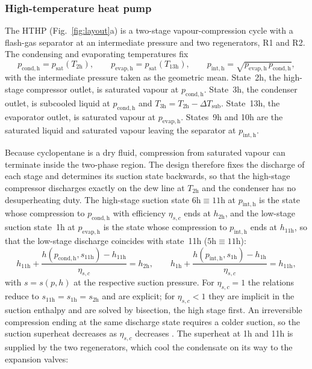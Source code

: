 \subsubsection{High-temperature heat pump}
\label{sec:hthp}

The HTHP (Fig.~\ref{fig:layout}a) is a two-stage vapour-compression cycle with
a flash-gas separator at an intermediate pressure and two regenerators, R1 and
R2. The condensing and evaporating temperatures fix
\begin{equation}
  p_\mathrm{cond,h}=p_\mathrm{sat}(T_\mathrm{2h}),\qquad
  p_\mathrm{evap,h}=p_\mathrm{sat}(T_\mathrm{13h}),\qquad
  p_\mathrm{int,h}=\sqrt{p_\mathrm{evap,h}\,p_\mathrm{cond,h}},
  \label{eq:hp-p}
\end{equation}
with the intermediate pressure taken as the geometric mean. State~2h, the
high-stage compressor outlet, is saturated vapour at $p_\mathrm{cond,h}$.
State~3h, the condenser outlet, is subcooled liquid at $p_\mathrm{cond,h}$
and $T_\mathrm{3h}=T_\mathrm{2h}-\Delta T_\mathrm{sub}$. State~13h, the
evaporator outlet, is saturated vapour at $p_\mathrm{evap,h}$. States~9h and
10h are the saturated liquid and saturated vapour leaving the separator at
$p_\mathrm{int,h}$.

Because cyclopentane is a dry fluid, compression from saturated vapour can
terminate inside the two-phase region. The design therefore fixes the
discharge of each stage and determines its suction state backwards, so that the
high-stage compressor discharges exactly on the dew line at $T_\mathrm{2h}$ and
the condenser has no desuperheating duty. The high-stage suction state
$\mathrm{6h}\equiv\mathrm{11h}$ at $p_\mathrm{int,h}$ is the state whose
compression to $p_\mathrm{cond,h}$ with efficiency $\eta_{s,c}$ ends at
$h_\mathrm{2h}$, and the low-stage suction state~1h at $p_\mathrm{evap,h}$ is
the state whose compression to $p_\mathrm{int,h}$ ends at $h_\mathrm{11h}$, so
that the low-stage discharge coincides with state~11h ($\mathrm{5h}\equiv
\mathrm{11h}$):
\begin{equation}
  h_\mathrm{11h}+\frac{h\left(p_\mathrm{cond,h},s_\mathrm{11h}\right)-h_\mathrm{11h}}{\eta_{s,c}}
  =h_\mathrm{2h},
  \qquad
  h_\mathrm{1h}+\frac{h\left(p_\mathrm{int,h},s_\mathrm{1h}\right)-h_\mathrm{1h}}{\eta_{s,c}}
  =h_\mathrm{11h},
  \label{eq:hp-suction}
\end{equation}
with $s=s(p,h)$ at the respective suction pressure. For $\eta_{s,c}=1$ the
relations reduce to $s_\mathrm{11h}=s_\mathrm{1h}=s_\mathrm{2h}$ and are
explicit; for $\eta_{s,c}<1$ they are implicit in the suction enthalpy and are
solved by bisection, the high stage first. An irreversible compression
ending at the same discharge state requires a colder suction, so the suction
superheat decreases as $\eta_{s,c}$ decreases . The superheat at 1h and 11h is supplied by the two
regenerators, which cool the condensate on its way to the expansion valves:

